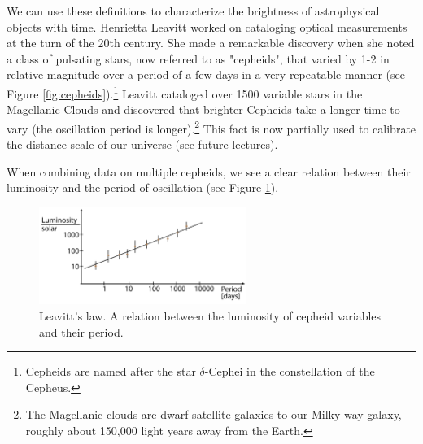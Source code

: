 \documentclass[a4paper,12pt]{article}
\theoremstyle{remark}
\renewcommand{\=}[1]{\stackrel{#1}{=}} %
\theoremstyle{plain}
\theoremstyle{definition}
\begin{document}
We can use these definitions to characterize the brightness of astrophysical objects with time. Henrietta Leavitt worked on cataloging optical measurements at the turn of the 20th century. She made a remarkable discovery when she noted a class of pulsating stars, now referred to as "cepheids", that varied by 1-2 in relative magnitude over a period of a few days in a very repeatable manner (see Figure \ref{fig:cepheids}).\footnote{Cepheids are named after the star $\delta$-Cephei in the constellation of the Cepheus.} Leavitt cataloged over 1500 variable stars in the Magellanic Clouds and discovered that brighter Cepheids take a longer time to vary (the oscillation period is longer).\footnote{The Magellanic clouds are dwarf satellite galaxies to our Milky way galaxy, roughly about 150,000 light years away from the Earth.} This fact is now partially used to calibrate the distance scale of our universe (see future lectures). %

When combining data on multiple cepheids, we see a clear relation between their luminosity and the period of oscillation (see Figure \ref{fig:lr}).

\begin{figure}[t]
\begin{center}
    \includegraphics*[angle=0,width=0.6\textwidth]{img/luminosity_relation.png}
    \caption[Insert text]{Leavitt's law. A relation between the luminosity of cepheid variables and their period.}
\label{fig:lr}
\end{center}
\end{figure}
\end{document}
